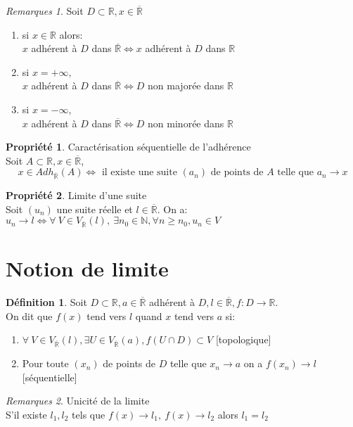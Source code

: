 \documentclass[fleqn]{article}
\theoremstyle{definition} \newtheorem*{defi}{D\'efinition}
\theoremstyle{definition} \newtheorem*{theo}{Th\'eor\`eme}
\theoremstyle{definition} \newtheorem*{prop}{Propri\'et\'e}
\theoremstyle{remark} \newtheorem*{rqs}{Remarques}
\begin{document}
\begin{rqs}
	Soit $D \subset \mathbb{R}, x \in \overline{\mathbb{R}}$
	\begin{enumerate}
		\item si $x \in \mathbb{R}$ alors: \\
			$x$ adh\'erent \`a $D$ dans $\overline{\mathbb{R}} \Leftrightarrow x$ adh\'erent \`a $D$ dans $\mathbb{R}$
		\item si $x = +\infty,$ \\
			$x$ adh\'erent \`a $D$ dans $\overline{\mathbb{R}} \Leftrightarrow D$ non major\'ee dans $\mathbb{R}$
		\item si $x = -\infty,$ \\
			$x$ adh\'erent \`a $D$ dans $\overline{\mathbb{R}} \Leftrightarrow D$ non minor\'ee dans $\mathbb{R}$
	\end{enumerate}
\end{rqs}
\begin{prop} Caract\'erisation s\'equentielle de l'adh\'erence \\
	Soit $A \subset \mathbb{R}, x \in \overline{\mathbb{R}}$,
	\[x \in Adh_{\overline{\mathbb{R}}%
	}(A) \Leftrightarrow \text{ il existe une suite } (a_n) \text{ de points de } A \text{ telle que } a_n \rightarrow x\]
\end{prop}

\begin{prop} Limite d'une suite \\
	Soit $(u_n)$ une suite r\'eelle et $l \in \overline{\mathbb{R}}$. On a: \\
	$u_n \rightarrow l \Leftrightarrow \forall\ V \in V_{\overline{\mathbb{R}}%
	}(l),\ \exists n_0 \in \mathbb{N}, \forall n \geq n_0, u_n \in V$
\end{prop}

\section{Notion de limite}
\begin{defi}
	Soit $D \subset \mathbb{R}, a \in \overline{\mathbb{R}}$ adh\'erent \`a $D, l \in \overline{\mathbb{R}}, f: D \rightarrow \mathbb{R}$.\\
	On dit que $f(x)$ tend vers $l$ quand $x$ tend vers $a$ si:
	\begin{enumerate}
		\item $\forall\ V \in V_{\overline{\mathbb{R}}%
		}(l), \exists U \in V_{\overline{\mathbb{R}}%
		}(a), f(U \cap D) \subset V$ [topologique]
		\item Pour toute $(x_n)$ de points de $D$ telle que $x_n \rightarrow a$ on a $f(x_n) \rightarrow l $ [s\'equentielle]
	\end{enumerate}

	\begin{rqs} Unicit\'e de la limite \\
		S'il existe $l_1, l_2$ tels que $f(x) \rightarrow l_1,\ f(x) \rightarrow l_2$ alors $l_1 = l_2$
	\end{rqs}

\end{defi}
\end{document}
